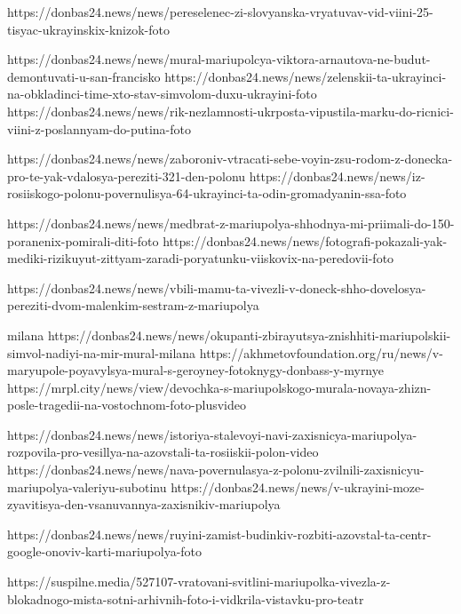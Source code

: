 https://donbas24.news/news/pereselenec-zi-slovyanska-vryatuvav-vid-viini-25-tisyac-ukrayinskix-knizok-foto

https://donbas24.news/news/mural-mariupolcya-viktora-arnautova-ne-budut-demontuvati-u-san-francisko
https://donbas24.news/news/zelenskii-ta-ukrayinci-na-obkladinci-time-xto-stav-simvolom-duxu-ukrayini-foto
https://donbas24.news/news/rik-nezlamnosti-ukrposta-vipustila-marku-do-ricnici-viini-z-poslannyam-do-putina-foto

https://donbas24.news/news/zaboroniv-vtracati-sebe-voyin-zsu-rodom-z-donecka-pro-te-yak-vdalosya-pereziti-321-den-polonu
https://donbas24.news/news/iz-rosiiskogo-polonu-povernulisya-64-ukrayinci-ta-odin-gromadyanin-ssa-foto

https://donbas24.news/news/medbrat-z-mariupolya-shhodnya-mi-priimali-do-150-poranenix-pomirali-diti-foto
https://donbas24.news/news/fotografi-pokazali-yak-mediki-rizikuyut-zittyam-zaradi-poryatunku-viiskovix-na-peredovii-foto

https://donbas24.news/news/vbili-mamu-ta-vivezli-v-doneck-shho-dovelosya-pereziti-dvom-malenkim-sestram-z-mariupolya

milana
https://donbas24.news/news/okupanti-zbirayutsya-znishhiti-mariupolskii-simvol-nadiyi-na-mir-mural-milana
https://akhmetovfoundation.org/ru/news/v-maryupole-poyavylsya-mural-s-geroyney-fotoknygy-donbass-y-myrnye
https://mrpl.city/news/view/devochka-s-mariupolskogo-murala-novaya-zhizn-posle-tragedii-na-vostochnom-foto-plusvideo

https://donbas24.news/news/istoriya-stalevoyi-navi-zaxisnicya-mariupolya-rozpovila-pro-vesillya-na-azovstali-ta-rosiiskii-polon-video
https://donbas24.news/news/nava-povernulasya-z-polonu-zvilnili-zaxisnicyu-mariupolya-valeriyu-subotinu
https://donbas24.news/news/v-ukrayini-moze-zyavitisya-den-vsanuvannya-zaxisnikiv-mariupolya

https://donbas24.news/news/ruyini-zamist-budinkiv-rozbiti-azovstal-ta-centr-google-onoviv-karti-mariupolya-foto


https://suspilne.media/527107-vratovani-svitlini-mariupolka-vivezla-z-blokadnogo-mista-sotni-arhivnih-foto-i-vidkrila-vistavku-pro-teatr


